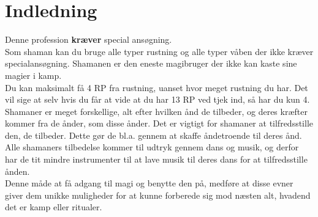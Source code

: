 \chapter{Indledning}

Denne profession \textbf{kræver} special ansøgning.\\

Som shaman kan du bruge alle typer rustning og alle typer våben der ikke kræver specialansøgning. Shamanen er den eneste magibruger der ikke kan kaste sine magier i kamp.\\
Du kan maksimalt få 4 RP fra rustning, uanset hvor meget rustning du har. Det vil sige at selv hvis du får at vide at du har 13 RP ved tjek ind, så har du kun 4.\\

Shamaner er meget forskellige, alt efter hvilken ånd de tilbeder, og deres kræfter kommer fra de ånder, som disse ånder. Det er vigtigt for shamaner at tilfredsstille den, de tilbeder. Dette gør de bl.a. gennem at skaffe åndetroende til deres ånd. Alle shamaners tilbedelse kommer til udtryk gennem dans og musik, og derfor har de tit mindre instrumenter til at lave musik til deres dans for at tilfredsstille ånden.\\
Denne måde at få adgang til magi og benytte den på, medføre at disse evner giver dem unikke muligheder for at kunne forberede sig mod næsten alt, hvadend det er kamp eller ritualer. 